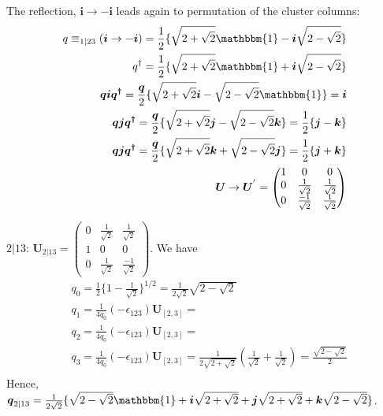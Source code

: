 \documentclass[twocolumn,aps,sort,nofootinbib]{revtex4}
\begin{document}
	The reflection, $\boldsymbol{i}\to -\boldsymbol{i}$ leads again to permutation of the cluster columns:
	\begin{eqnarray*}
		q\equiv_{1|23}(\boldsymbol{i}\to -\boldsymbol{i})=\frac{1}{2}\{\sqrt{2+\sqrt{2}}\mathbbm{1}-\boldsymbol{i}\sqrt{2-\sqrt{2}}\}\\
		q^{\dagger}=\frac{1}{2}\{\sqrt{2+\sqrt{2}}\mathbbm{1}+\boldsymbol{i}\sqrt{2-\sqrt{2}}\}\\
		\boldsymbol{qiq^\dagger}=\frac{\boldsymbol{q}}{2}\{\sqrt{2+\sqrt{2}}\boldsymbol{i}-\sqrt{2-\sqrt{2}}\mathbbm{1}\}=\boldsymbol{i}\\
		\boldsymbol{qjq^\dagger}=\frac{\boldsymbol{q}}{2}\{\sqrt{2+\sqrt{2}}\boldsymbol{j}-\sqrt{2-\sqrt{2}}\boldsymbol{k}\}=\frac{1}{2}\{\boldsymbol{j}-\boldsymbol{k}\}\\
		\boldsymbol{qjq^\dagger}=\frac{\boldsymbol{q}}{2}\{\sqrt{2+\sqrt{2}}\boldsymbol{k}+\sqrt{2-\sqrt{2}}\boldsymbol{j}\}=\frac{1}{2}\{\boldsymbol{j}+\boldsymbol{k}\}\\
	\boldsymbol{U}\to \boldsymbol{U}^{'}=\begin{pmatrix}1&0&0\\0&\frac{1}{\sqrt{2}}&\frac{1}{\sqrt{2}}\\0&\frac{-1}{\sqrt{2}}&\frac{1}{\sqrt{2}}\end{pmatrix}
	\end{eqnarray*}

	\textbf{$2|13$}: $\boldsymbol{U}_{2|13}=\begin{pmatrix}0&\frac{1}{\sqrt{2}}&\frac{1}{\sqrt{2}}\\1&0&0\\0&\frac{1}{\sqrt{2}}&\frac{-1}{\sqrt{2}}\end{pmatrix}$.
	We have 
	\begin{align*}
		&q_0=\frac{1}{2}\{1-\frac{1}{\sqrt{2}}\}^{1/2}=\frac{1}{2\sqrt{2}}\sqrt{2-\sqrt{2}}\\
		&q_1=\frac{1}{4q_0}(-\epsilon_{123})\boldsymbol{U}_{[2,3]}=\\
		&q_2=\frac{1}{4q_0}(-\epsilon_{123})\boldsymbol{U}_{[2,3]}=\\
		&q_3=\frac{1}{4q_0}(-\epsilon_{123})\boldsymbol{U}_{[2,3]}=
		\frac{1}{2\sqrt{2+\sqrt{2}}}(\frac{1}{\sqrt{2}}+\frac{1}{\sqrt{2}})=\frac{\sqrt{2-\sqrt{2}}}{2}\\
	\end{align*}
	Hence, $\boldsymbol{q}_{2|13}=\frac{1}{2\sqrt{2}}\{\sqrt{2-\sqrt{2}}\mathbbm{1}+\boldsymbol{i}\sqrt{2+\sqrt{2}}+\boldsymbol{j}\sqrt{2+\sqrt{2}}+\boldsymbol{k}\sqrt{2-\sqrt{2}}\}$.
\end{document}
